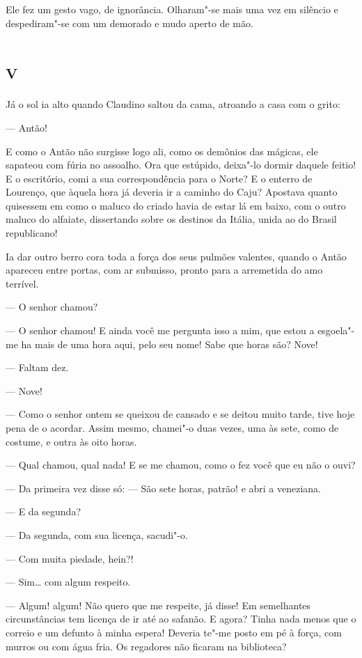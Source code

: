 Ele fez um gesto vago, de ignorância. Olharam"-se mais uma vez em
silêncio e despediram"-se com um demorado e mudo aperto de mão.

\section*{\textsc{v}}

Já o sol ia alto quando Claudino saltou da cama, atroando a casa com o
grito:

--- Antão!

E como o Antão não surgisse logo ali, como os demônios das mágicas, ele
sapateou com fúria no assoalho. Ora que estúpido, deixa"-lo dormir
daquele feitio! E o escritório, comi a sua correspondência para o Norte?
E o enterro de Lourenço, que àquela hora já deveria ir a caminho do
Caju? Apostava quanto quisessem em como o maluco do criado havia de
estar lá em baixo, com o outro maluco do alfaiate, dissertando sobre os
destinos da Itália, unida ao do Brasil republicano!

Ia dar outro berro cora toda a força dos seus pulmões valentes, quando o
Antão apareceu entre portas, com ar submisso, pronto para a arremetida
do amo terrível.

--- O senhor chamou?

--- O senhor chamou! E ainda você me pergunta isso a mim, que estou a
esgoela"-me ha mais de uma hora aqui, pelo seu nome! Sabe que horas são?
Nove!

--- Faltam dez.

--- Nove!

--- Como o senhor ontem se queixou de cansado e se deitou muito tarde,
tive hoje pena de o acordar. Assim mesmo, chamei"-o duas vezes, uma às
sete, como de costume, e outra às oito horas.

--- Qual chamou, qual nada! E se me chamou, como o fez você que eu não o
ouvi?

--- Da primeira vez disse só: --- São sete horas, patrão! e abri a
veneziana.

--- E da segunda?

--- Da segunda, com sua licença, sacudi"-o.

--- Com muita piedade, hein?!

--- Sim\ldots{} com algum respeito.

--- Algum! algum! Não quero que me respeite, já disse! Em semelhantes
circunstâncias tem licença de ir até ao safanão. E agora? Tinha nada
menos que o correio e um defunto à minha espera! Deveria te"-me posto em
pé à força, com murros ou com água fria. Os regadores não ficaram na
biblioteca?

